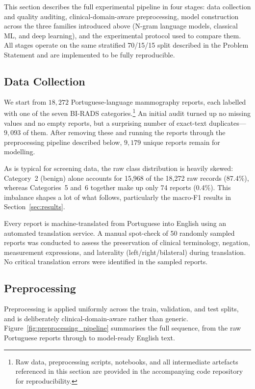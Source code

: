 \documentclass[11pt,a4paper]{article}
\begin{document}
This section describes the full experimental pipeline in four stages: data
collection and quality auditing, clinical-domain-aware preprocessing, model
construction across the three families introduced above (N-gram language
models, classical ML, and deep learning), and the experimental protocol used
to compare them. All stages operate on the same stratified 70/15/15 split
described in the Problem Statement and are implemented to be fully
reproducible.

\subsection{Data Collection}

We start from $18{,}272$ Portuguese-language mammography reports, each labelled
with one of the seven BI-RADS categories.\footnote{Raw data, preprocessing
scripts, notebooks, and all intermediate artefacts referenced in this section
are provided in the accompanying code repository for reproducibility.}
An initial audit turned up no missing values and no empty reports, but a
surprising number of exact-text duplicates---$9{,}093$ of them. After removing
these and running the reports through the preprocessing pipeline described
below, $9{,}179$ unique reports remain for modelling.

As is typical for screening data, the raw class distribution is heavily
skewed: Category~2 (benign) alone accounts for 15{,}968 of the 18{,}272 raw
records (87.4\%), whereas Categories~5 and~6 together make up only 74 reports
(0.4\%). This imbalance shapes a lot of what follows, particularly the
macro-F1 results in Section~\ref{sec:results}.

Every report is machine-translated from Portuguese into English using an automated translation service. A manual spot-check of 50 randomly sampled reports was conducted to assess the preservation of clinical terminology, negation, measurement expressions, and laterality (left/right/bilateral) during translation. No critical translation errors were identified in the sampled reports.

\subsection{Preprocessing}

Preprocessing is applied uniformly across the train, validation, and test
splits, and is deliberately clinical-domain-aware rather than generic.
Figure~\ref{fig:preprocessing_pipeline} summarises the full sequence, from
the raw Portuguese reports through to model-ready English text.
\end{document}
